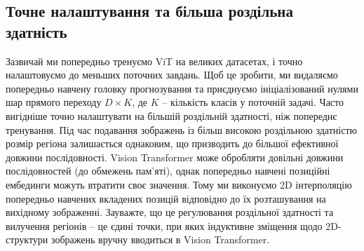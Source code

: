 \subsection{Точне налаштування та більша роздільна здатність}
Зазвичай ми попередньо тренуємо ViT на великих датасетах,
і точно налаштовуємо до меньших поточних завдань. Щоб це зробити,
ми видаляємо попередньо навчену головку прогнозування
та приєднуємо ініціалізований нулями шар прямого переходу
$D \times K$, де $K$ -- кількість класів у поточній задачі.
Часто вигідніше точно налаштувати на більшій роздільній здатності,
ніж попереднє тренування. Під час подавання зображень із більш високою
роздільною здатністю розмір регіона залишається однаковим,
що призводить до більшої ефективної довжини послідовності.
Vision Transformer може обробляти довільні довжини послідовностей
(до обмежень пам’яті), однак попередньо навчені позиційні
ембединги можуть втратити своє значення. Тому ми виконуємо
2D інтерполяцію попередньо навчених вкладених позицій відповідно
до їх розташування на вихідному зображенні. Зауважте, що це
регулювання роздільної здатності та вилучення регіонів -- це єдині
точки, при яких індуктивне зміщення щодо 2D-структури зображень
вручну вводиться в Vision Transformer.
